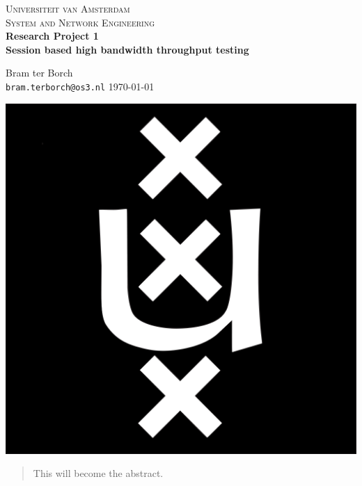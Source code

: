 \documentclass[11pt,a4paper,notitlepage,openany]{report}
\begin{document}
\begin{titlingpage}
\noindent
\begin{center}
\textsc{\Large Universiteit van Amsterdam}\\[0.2cm]
\textsc{\large System and Network Engineering}\\[0.5cm]

{ \large \bfseries Research Project 1}\\[0.2cm]
{ \LARGE \bfseries Session based high bandwidth throughput testing}\\[0.5cm]
\begin{footnotesize}
Bram ter Borch\\
\texttt{bram.terborch@os3.nl}
{\large \mydate\today}
\end{footnotesize}

\centering
\vspace{2.0cm}
\includegraphics[scale=0.07]{images/uva_logo.png}
\vspace*{2.5cm}
\begin{abstract}
This will become the abstract.
\end{abstract}
\end{center}
\end{titlingpage}

\renewcommand{\contentsname}{Table of Contents}
\setcounter{tocdepth}{1}
\tableofcontents
{}
\begin{flushleft}
\end{flushleft}







\nocite{*}


%
%
\end{document}
